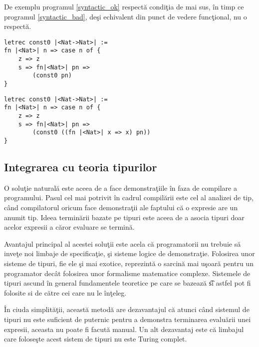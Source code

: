 \begin{example}
De exemplu programul \ref{syntactic_ok} respect\u a condi\c tia de mai sus, \^in timp ce programul \ref{syntactic_bad}, de\c si echivalent din punct de vedere func\c tional, nu o respect\u a.
\end{example}
\begin{lstlisting}[label=syntactic_ok,captionpos=b,caption=Exemplu corect,float=tb]
letrec const0 |<Nat->Nat>| :=
fn |<Nat>| n => case n of {
    z => z
    s => fn|<Nat>| pn =>
        (const0 pn)
}
\end{lstlisting}
\begin{lstlisting}[label=syntactic_bad,captionpos=b,caption=Exemplu incorect,float=tb]
letrec const0 |<Nat->Nat>| :=
fn |<Nat>| n => case n of {
    z => z
    s => fn|<Nat>| pn =>
        (const0 ((fn |<Nat>| x => x) pn))
}
\end{lstlisting}
\done{}

\subsection{Integrarea cu teoria tipurilor}

O solu\c tie natural\u a este aceea de a face demonstra\c tiile \^in faza de compilare a programului. Pasul cel mai potrivit \^in cadrul compil\u arii este cel al analizei de tip, c\^and compilatorul oricum face demonstra\c tii ale faptului c\u a o expresie are un anumit tip. Ideea termin\u arii bazate pe tipuri este aceea de a asocia tipuri doar acelor expresii a c\u aror evaluare se termin\u a.

Avantajul principal al acestei solu\c tii este acela c\u a programatorii nu trebuie s\u a inve\c te noi limbaje de specifica\c tie, \c si sisteme logice de demonstra\c tie. Folosirea unor sisteme de tipuri, fie ele \c si mai exotice, reprezint\u a o sarcin\u a mai u\c soar\u a pentru un programator dec\^at folosirea unor formalisme matematice complexe. Sistemele de tipuri ascund \^in general fundamentele teoretice pe care se bazeaz\u a \t si astfel pot fi folosite si de c\u atre cei care nu le \^in\c teleg.

\^ In ciuda simplit\u a\c tii, aceast\u a metod\u a are dezavantajul c\u a atunci c\^and sistemul de tipuri nu este suficient de puternic pentru a demonstra terminarea evalu\u arii unei expresii, aceasta nu poate fi facut\u a manual. Un alt dezavantaj este c\u a limbajul care folose\c ste acest sistem de tipuri nu este Turing complet. 